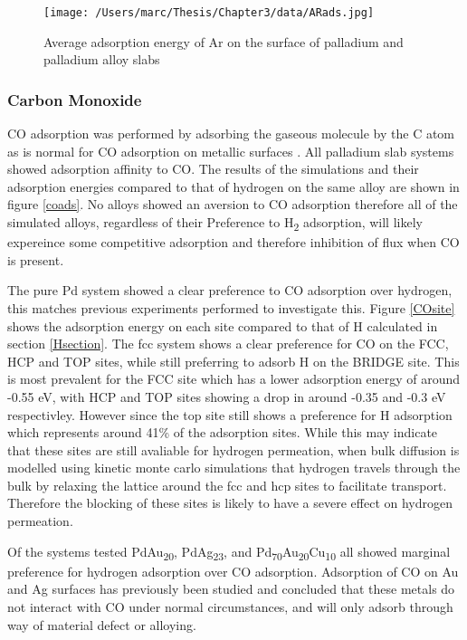         \begin{figure}
            \centering
            \texttt{[image: /Users/marc/Thesis/Chapter3/data/ARads.jpg]}
            \caption{Average adsorption energy of Ar on the surface of palladium and palladium alloy slabs}
            \label{Arads}
          \end{figure}
        
\subsubsection{Carbon Monoxide}
CO adsorption was performed by adsorbing the gaseous molecule by the C atom as is normal for CO adsorption on metallic surfaces \cite{doi:10.1021/acscatal.8b02371}. All palladium slab systems showed adsorption affinity to CO. The results of the simulations and their adsorption energies compared to that of hydrogen on the same alloy are shown in figure \ref{coads}.  No alloys showed an aversion to CO adsorption therefore all of the simulated alloys, regardless of their Preference to H\textsubscript{2} adsorption, will likely expereince some competitive adsorption and therefore inhibition of flux when CO is present. 

The pure Pd system showed a clear preference to CO adsorption over hydrogen, this matches previous experiments performed to investigate this. \cite{Xu2016a} Figure \ref{COsite} shows the adsorption energy on each site compared to that of H calculated in section \ref{Hsection}. The fcc system shows a clear preference for CO on the FCC, HCP and TOP sites, while still preferring to adsorb H on the BRIDGE site. This is most prevalent for the FCC site which has a lower adsorption energy of around -0.55 eV, with HCP and TOP sites showing a drop in around -0.35 and -0.3 eV respectivley. However since the top site still shows a preference for H adsorption which represents around 41\% of the adsorption sites. While this may indicate that these sites are still avaliable for hydrogen permeation, when bulk diffusion is modelled using kinetic monte carlo simulations that hydrogen travels through the bulk by relaxing the lattice around the fcc and hcp sites to facilitate transport. \cite{Qin2012} Therefore the blocking of these sites is likely to have a severe effect on hydrogen permeation.

Of the systems tested PdAu\textsubscript{20}, PdAg\textsubscript{23}, and Pd\textsubscript{70}Au\textsubscript{20}Cu\textsubscript{10} all showed marginal preference for hydrogen adsorption over CO adsorption. Adsorption of CO on Au and Ag surfaces has previously been studied and concluded that these metals do not interact with CO under normal circumstances, and will only adsorb through way of material defect or alloying. \cite{doi:10.1021/la950167j} \cite{shaikhutdinov_meyer_naschitzki_baumer_freund_2003}

